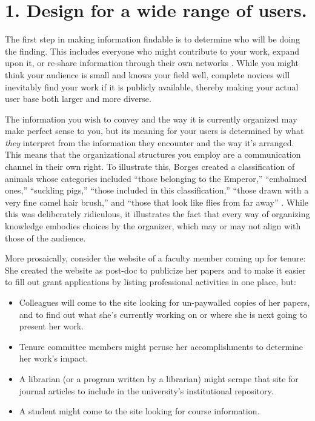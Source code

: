 \documentclass[10pt,letterpaper]{article}
\newcommand{\rulemajor}[1]{\section*{#1}}
\begin{document}
\rulemajor{1. Design for a wide range of users.}

The first step in making information findable is to determine who will be doing
the finding. This includes everyone who might contribute to your work, expand
upon it, or re-share information through their own networks \cite{Covert2014}.
While you might think your audience is small and knows your field well, complete
novices will inevitably find your work if it is publicly available, thereby
making your actual user base both larger and more diverse.

The information you wish to convey and the way it is currently organized may
make perfect sense to you, but its meaning for your users is determined by what
\emph{they} interpret from the information they encounter and the way it's
arranged. This means that the organizational structures you employ are a
communication channel in their own right. To illustrate this, Borges created a
classification of animals whose categories included ``those belonging to the
Emperor,'' ``embalmed ones,'' ``suckling pigs,'' ``those included in this
classification,'' ``those drawn with a very fine camel hair brush,'' and ``those
that look like flies from far away'' \cite{Borges2000}. While this was
deliberately ridiculous, it illustrates the fact that every way of organizing
knowledge embodies choices by the organizer, which may or may not align with
those of the audience.

More prosaically, consider the website of a faculty member coming up for tenure:
She created the website as post-doc to publicize her papers and to make it
easier to fill out grant applications by listing professional activities in one
place, but:

\begin{itemize}

\item
  Colleagues will come to the site looking for un-paywalled copies of her
  papers, and to find out what she's currently working on or where she is next
  going to present her work.

\item
  Tenure committee members might peruse her accomplishments to determine her
  work's impact.

\item
  A librarian (or a program written by a librarian) might scrape that site for
  journal articles to include in the university's institutional repository.

\item
  A student might come to the site looking for course information.

\end{itemize}
\end{document}
